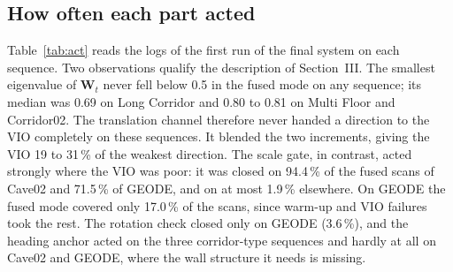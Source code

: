 \documentclass[journal]{IEEEtran}
\begin{document}
\subsection{How often each part acted}
Table~\ref{tab:act} reads the logs of the first run of the final system on each sequence. Two observations qualify the description of Section~III. The smallest eigenvalue of $\mathbf W_t$ never fell below 0.5 in the fused mode on any sequence; its median was 0.69 on Long Corridor and 0.80 to 0.81 on Multi Floor and Corridor02. The translation channel therefore never handed a direction to the VIO completely on these sequences. It blended the two increments, giving the VIO 19 to 31\,\% of the weakest direction. The scale gate, in contrast, acted strongly where the VIO was poor: it was closed on 94.4\,\% of the fused scans of Cave02 and 71.5\,\% of GEODE, and on at most 1.9\,\% elsewhere. On GEODE the fused mode covered only 17.0\,\% of the scans, since warm-up and VIO failures took the rest. The rotation check closed only on GEODE (3.6\,\%), and the heading anchor acted on the three corridor-type sequences and hardly at all on Cave02 and GEODE, where the wall structure it needs is missing.

\begin{table}[t]
\caption{How often each part acted (final system, first run per sequence; shares of scans)}
\label{tab:act}
\centering\footnotesize
{}
\end{table}
\end{document}

